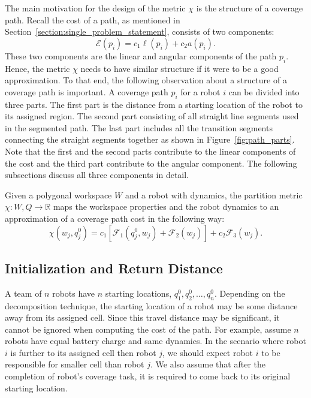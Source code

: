 \documentclass[../main.tex]{subfiles}
\begin{document}
The main motivation for the design of the metric $\chi$ is the structure of a coverage path. Recall the cost of a path, as mentioned in Section~\ref{section:single_problem_statement}, consists of two components:
\begin{equation}
	\mathcal{E}(p_i)=c_1\ell(p_i)+c_2a(p_i).
\end{equation}
These two components are the linear and angular components of the path $p_i$. Hence, the metric $\chi$ needs to have similar structure if it were to be a good approximation. To that end, the following observation about a structure of a coverage path is important. A coverage path $p_i$ for a robot $i$ can be divided into three parts. The first part is the distance from a starting location of the robot to its assigned region. The second part consisting of all straight line segments used in the segmented path. The last part includes all the transition segments connecting the straight segments together as shown in Figure~\ref{fig:path_parts}. Note that the first and the second parts contribute to the linear components of the cost and the third part contribute to the angular component. The following subsections discuss all three components in detail.


\begin{definition}
Given a polygonal workspace $W$ and a robot with dynamics, the partition metric $\chi:W,Q\to\mathbb{R}$ maps the workspace properties and the robot dynamics to an approximation of a coverage path cost in the following way:
	\begin{equation}
		\chi(w_j,q_j^0)=c_1[\mathcal{F}_1(q^0_j,w_j)+\mathcal{F}_2(w_j)]+c_2\mathcal{F}_3(w_j).
	\end{equation}
\end{definition}


\subsection{Initialization and Return Distance}
\label{subsection:init_ret_distance}

A team of $n$ robots have $n$ starting locations, $q^0_1,q^0_2,\ldots,q^0_n$. Depending on the decomposition technique, the starting location of a robot may be some distance away from its assigned cell. Since this travel distance may be significant, it cannot be ignored when computing the cost of the path. For example, assume $n$ robots have equal battery charge and same dynamics. In the scenario where robot $i$ is further to its assigned cell then robot $j$, we should expect robot $i$ to be responsible for smaller cell than robot $j$. We also assume that after the completion of robot's coverage task, it is required to come back to its original starting location.
\end{document}
